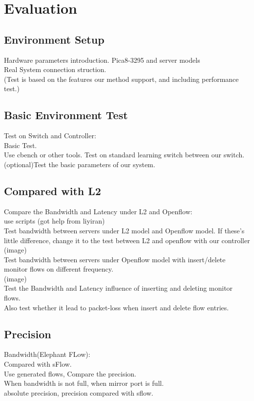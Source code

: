 \documentclass{acm_proc_article-sp}
\begin{document}
\section{Evaluation}

\subsection{Environment Setup}
Hardware parameters introduction. Pica8-3295 and server models\\
Real System connection struction.\\

(Test is based on the features our method support, and including performance test.)

\subsection{Basic Environment Test}
Test on Switch and Controller:\\
Basic Test.\\
Use cbench or other tools. Test on standard learning switch between our switch.\\
(optional)Test the basic parameters of our system.

\subsection{Compared with L2}
Compare the Bandwidth and Latency under L2 and Openflow:\\
use scripts (got help from liyiran)\\
Test bandwidth between servers under L2 model and Openflow model. If these's little difference, change it to the test between L2 and openflow with our controller\\
(image)\\
Test bandwidth between servers under Openflow model with insert/delete monitor flows on different frequency.\\
(image)\\

Test the Bandwidth and Latency influence of inserting and deleting monitor flows.\\
Also test whether it lead to packet-loss when insert and delete flow entries.\\

\subsection{Precision}
Bandwidth(Elephant FLow):\\
Compared with sFlow.\\
Use generated flows, Compare the precision.\\
When bandwidth is not full, when mirror port is full.\\
absolute precision, precision compared with sflow.
\end{document}
